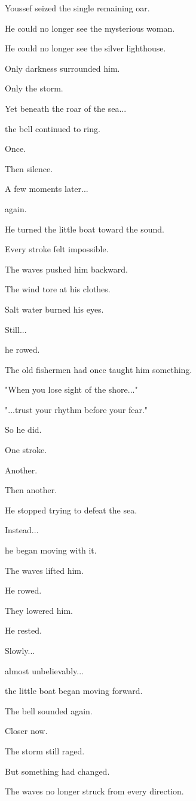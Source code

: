 \documentclass[12pt,openany]{book}
\begin{document}
Youssef seized the single remaining oar.

He could no longer see the mysterious woman.

He could no longer see the silver lighthouse.

Only darkness surrounded him.

Only the storm.

Yet beneath the roar of the sea...

the bell continued to ring.

Once.

Then silence.

A few moments later...

again.

He turned the little boat toward the sound.

Every stroke felt impossible.

The waves pushed him backward.

The wind tore at his clothes.

Salt water burned his eyes.

Still...

he rowed.

The old fishermen had once taught him something.

"When you lose sight of the shore..."

"...trust your rhythm before your fear."

So he did.

One stroke.

Another.

Then another.

He stopped trying to defeat the sea.

Instead...

he began moving with it.

The waves lifted him.

He rowed.

They lowered him.

He rested.

Slowly...

almost unbelievably...

the little boat began moving forward.

The bell sounded again.

Closer now.

The storm still raged.

But something had changed.

The waves no longer struck from every direction.
\end{document}
